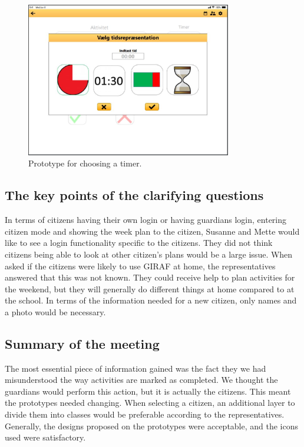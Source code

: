 \begin{figure}[h!]
  \center
  \includegraphics[width=0.8\textwidth]{figures/select-timer-prototype.JPG}
  \caption{\label{fig:choose-citizen-prototype} Prototype for choosing a timer.}
\end{figure}

\subsection{The key points of the clarifying questions}
In terms of citizens having their own login or having guardians login, entering citizen mode and showing the week plan to the citizen, Susanne and Mette would like to see a login functionality specific to the citizens.
They did not think citizens being able to look at other citizen's plans would be a large issue.
When asked if the citizens were likely to use GIRAF at home, the representatives answered that this was not known.
They could receive help to plan activities for the weekend, but they will generally do different things at home compared to at the school.
In terms of the information needed for a new citizen, only names and a photo would be necessary.

\subsection{Summary of the meeting}
The most essential piece of information gained was the fact they we had misunderstood the way activities are marked as completed.
We thought the guardians would perform this action, but it is actually the citizens.
This meant the prototypes needed changing.
When selecting a citizen, an additional layer to divide them into classes would be preferable according to the representatives.
Generally, the designs proposed on the prototypes were acceptable, and the icons used were satisfactory.
